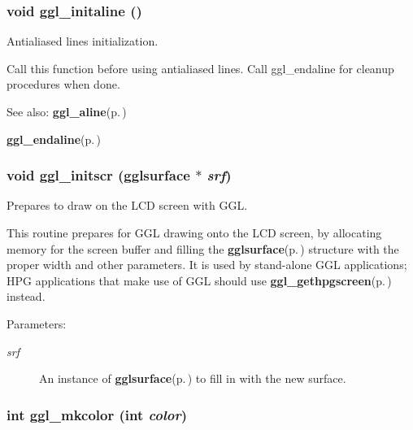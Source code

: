 \subsubsection{\setlength{\rightskip}{0pt plus 5cm}void ggl\_\-initaline ()}\label{ggl_8h_a34}


Antialiased lines initialization. 

Call this function before using antialiased lines. Call ggl\_\-endaline for cleanup procedures when done.

\begin{Desc}
\item[See also:]{\bf ggl\_\-aline}{\rm (p.\,\pageref{ggl_8h_a35})} 

{\bf ggl\_\-endaline}{\rm (p.\,\pageref{ggl_8h_a36})} \end{Desc}
\subsubsection{\setlength{\rightskip}{0pt plus 5cm}void ggl\_\-initscr ({\bf gglsurface} $\ast$ {\em srf})}\label{ggl_8h_a9}


Prepares to draw on the LCD screen with GGL. 

This routine prepares for GGL drawing onto the LCD screen, by allocating memory for the screen buffer and filling the {\bf gglsurface}{\rm (p.\,\pageref{structgglsurface})} structure with the proper width and other parameters. It is used by stand-alone GGL applications; HPG applications that make use of GGL should use {\bf ggl\_\-gethpgscreen}{\rm (p.\,\pageref{ggl_8h_a10})} instead.

\begin{Desc}
\item[Parameters:]
\begin{description}
\item[{\em srf}]An instance of {\bf gglsurface}{\rm (p.\,\pageref{structgglsurface})} to fill in with the new surface. \end{description}
\end{Desc}
\subsubsection{\setlength{\rightskip}{0pt plus 5cm}int ggl\_\-mkcolor (int {\em color})}\label{ggl_8h_a32}


